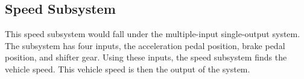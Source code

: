 \documentclass[conference]{IEEEtran}
\begin{document}


  \subsection{Speed Subsystem}
  This speed subsystem would fall under the multiple-input single-output system. %
  The subsystem has four inputs, the acceleration pedal position, brake pedal position, and shifter gear. Using these inputs, the speed subsystem finds the vehicle speed. This vehicle speed is then the output of the system.



\end{document}
